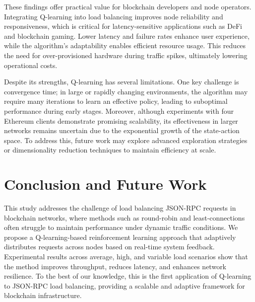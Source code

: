\documentclass[lnbip]{svmultln}
\begin{document}
These findings offer practical value for blockchain developers and node operators. Integrating Q-learning into load balancing improves node reliability and responsiveness, which is critical for latency-sensitive applications such as DeFi and blockchain gaming. Lower latency and failure rates enhance user experience, while the algorithm's adaptability enables efficient resource usage. This reduces the need for over-provisioned hardware during traffic spikes, ultimately lowering operational costs.

Despite its strengths, Q-learning has several limitations. One key challenge is convergence time; in large or rapidly changing environments, the algorithm may require many iterations to learn an effective policy, leading to suboptimal performance during early stages. Moreover, although experiments with four Ethereum clients demonstrate promising scalability, its effectiveness in larger networks remains uncertain due to the exponential growth of the state-action space. To address this, future work may explore advanced exploration strategies or dimensionality reduction techniques to maintain efficiency at scale.

\section{Conclusion and Future Work}\label{s:7}
This study addresses the challenge of load balancing JSON-RPC requests in blockchain networks, where methods such as round-robin and least-connections often struggle to maintain performance under dynamic traffic conditions. We propose a Q-learning-based reinforcement learning approach that adaptively distributes requests across nodes based on real-time system feedback. Experimental results across average, high, and variable load scenarios show that the method improves throughput, reduces latency, and enhances network resilience. To the best of our knowledge, this is the first application of Q-learning to JSON-RPC load balancing, providing a scalable and adaptive framework for blockchain infrastructure.

\end{document}
